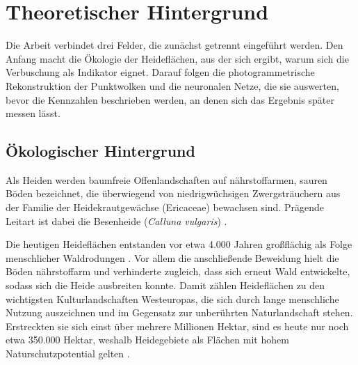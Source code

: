 \newpage
\section{Theoretischer Hintergrund}\label{theoretischer_hintergrund}

Die Arbeit verbindet drei Felder, die zunächst getrennt eingeführt werden. Den Anfang macht die Ökologie der Heideflächen, aus der sich ergibt, warum sich die Verbuschung als Indikator eignet. Darauf folgen die photogrammetrische Rekonstruktion der Punktwolken und die neuronalen Netze, die sie auswerten, bevor die Kennzahlen beschrieben werden, an denen sich das Ergebnis später messen lässt.

\subsection{Ökologischer Hintergrund}\label{okologischer_hintergrund}

Als Heiden werden baumfreie Offenlandschaften auf nährstoffarmen, sauren Böden bezeichnet, die überwiegend von niedrigwüchsigen Zwergsträuchern aus der Familie der Heidekrautgewächse (Ericaceae) bewachsen sind. Prägende Leitart ist dabei die Besenheide (\textit{Calluna vulgaris}) \cite{Bobbink.2010}.

Die heutigen Heideflächen entstanden vor etwa 4.000 Jahren großflächig als Folge menschlicher Waldrodungen \cite{Webb.1998}. Vor allem die anschließende Beweidung hielt die Böden nährstoffarm und verhinderte zugleich, dass sich erneut Wald entwickelte, sodass sich die Heide ausbreiten konnte. Damit zählen Heideflächen zu den wichtigsten Kulturlandschaften Westeuropas, die sich durch lange menschliche Nutzung auszeichnen und im Gegensatz zur unberührten Naturlandschaft stehen. Erstreckten sie sich einst über mehrere Millionen Hektar, sind es heute nur noch etwa 350.000 Hektar, weshalb Heidegebiete als Flächen mit hohem Naturschutzpotential gelten \cite{Webb.1998}.

